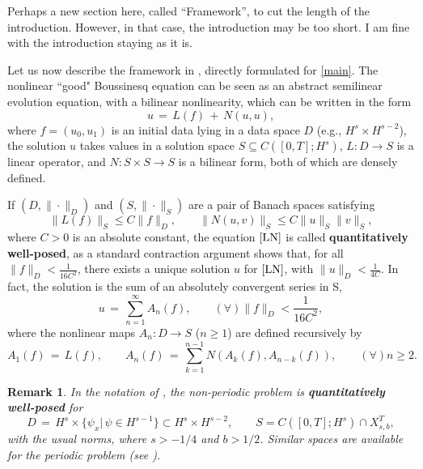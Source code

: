 \documentclass{amsart}
\newtheorem{remark}[theorem]{Remark}
\begin{document}
\begin{framed}
  Perhaps a new section here, called ``Framework'', to cut the length of the introduction. However, in that case, the introduction may be too short. I am fine with the introduction staying as it is.
\end{framed}
%
Let us now describe the framework in \cite{BT06}, directly formulated for \eqref{main}. The nonlinear ``good" Boussinesq equation can be seen as an abstract semilinear evolution equation, with a bilinear nonlinearity, which can be written in the form 
\begin{equation}
u\,=\,L(f)\,+\,N(u,u),
\label{LN}
\end{equation}
where $f=(u_0, u_1)$ is an initial data lying in a data space $D$ (e.g., $H^s \times H^{s-2}$), the solution $u$ takes values in a solution space $S \subseteq	 C([0, T]; H^s)$, $L: D \to S$ is a linear operator, and $N:S\times S \to S$ is a bilinear form, both of which are densely defined.  

If  $(D,\|\cdot \|_D)$ and $(S,\|\cdot \|_S)$ are a pair of Banach spaces satisfying 
\begin{equation}
\|L(f)\|_S \leq C \|f\|_D,\qquad \|N(u,v)\|_S \leq C \|u\|_S \|v\|_S,
\label{estim}
\end{equation}
where $C>0$ is an absolute constant, the equation $\eqref{LN}$ is called \textbf{quantitatively well-posed}, as a standard contraction argument shows that, for all  $\|f\|_D<\frac{1}{16C^2}$, there exists a unique solution $u$ for $\eqref{LN}$, with $\|u\|_D<\frac{1}{4C}$. In fact, the solution is the sum of an absolutely convergent series in S, 
\begin{equation}
u\,=\,\sum_{n=1}^{\infty} A_n(f), \qquad (\forall) \|f\|_D<\frac{1}{16C^2},
\label{series}
\end{equation}
where the nonlinear maps $A_n: D\to S$ ($n\geq 1$) are defined recursively by
\begin{equation}
A_1(f)\,=\,L(f), \qquad A_n(f)\,=\,\sum_{k=1}^{n-1} N(A_k(f),A_{n-k}(f)), \qquad (\forall)n\geq 2.
\label{An}
\end{equation}


\begin{remark}
In the notation of \cite{F09}, the non-periodic problem is \textbf{quantitatively well-posed} for
\[
D\,=\,H^s\times \{\psi_x |\,\psi\in H^{s-1}\} \subset H^s\times H^{s-2}, \qquad S= C([0,T]; H^s)\cap X^T_{s,b},\]
with the usual norms, where $s>-1/4$ and $b>1/2$. Similar spaces are available for the periodic problem (see \cite{FS10}).
\label{qw}
\end{remark}
\end{document}
